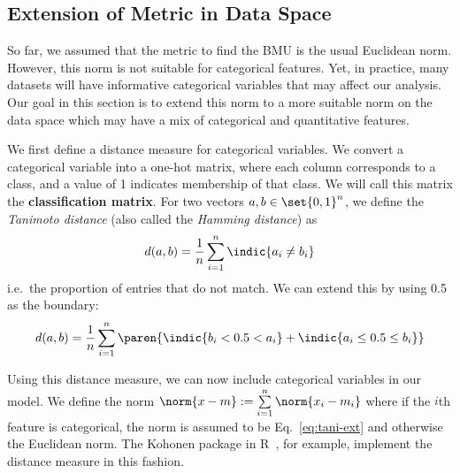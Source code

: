\subsection{Extension of Metric in Data Space}\label{ssec:metric-extension}

So far, we assumed that the metric to find the BMU is the usual Euclidean norm.
However, this norm is not suitable for categorical features.
Yet, in practice, many datasets will have informative categorical variables
that may affect our analysis. 
Our goal in this section is to extend this norm to a more suitable norm
on the data space which may have a mix of categorical and quantitative features.

We first define a distance measure for categorical variables. 
We convert a categorical variable into a one-hot matrix, 
where each column corresponds to a class, 
and a value of 1 indicates membership of that class. 
We will call this matrix the \textbf{classification matrix}. 
For two vectors $a,b \in \set{0,1}^n$, we define the \emph{Tanimoto distance} 
(also called the \emph{Hamming distance}) as 
\[ 
    d(a,b) = \frac{1}{n} \sum_{i=1}^n \indic{a_i \neq b_i}
\] 
i.e.\ the proportion of entries that do not match. 
We can extend this by using 0.5 as the boundary: 
\begin{align}
    d(a,b) = \frac{1}{n} \sum_{i=1}^n 
    \paren{\indic{b_i < 0.5 < a_i} + \indic{a_i \leq 0.5 \leq b_i}}
    \label{eq:tani-ext}
\end{align}

Using this distance measure, we can now include categorical variables in our model. 
We define the norm $\norm{x-m} := \sum\limits_{i=1}^n \norm{x_i - m_i}$
where if the $i$th feature is categorical, 
the norm is assumed to be Eq.~\ref{eq:tani-ext}
and otherwise the Euclidean norm.
The Kohonen package in R~\cite{wehrens:2007}\cite{wehrens:2018},
for example, implement the distance measure in this fashion.
